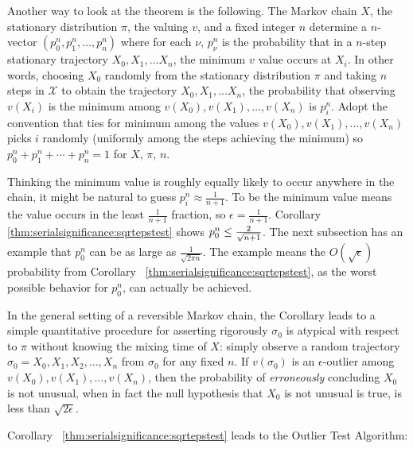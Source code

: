\documentclass[12pt]{article}
\begin{document}
Another way to look at the theorem is the following.  The Markov chain \(
X \), the stationary distribution \( \pi \), the valuing \( v \), and a
fixed integer \( n \) determine a \( n \)-vector \( (p_0^n, p_1^n, \dots,
p_n^n) \) where for each \( \nu \), \( p_{\nu}^n \) is the probability
that in a \( n \)-step stationary trajectory \( X_0, X_1, \dots X_n \),
the minimum \( v \) value occurs at \( X_i \).  In other words, choosing
\( X_0 \) randomly from the stationary distribution \( \pi \) and taking
\( n \) steps in \( \mathcal{X} \) to obtain the trajectory \( X_0, X_1,
\dots X_n \), the probability that observing \( v(X_i) \) is the minimum
among \( v(X_0), v(X_1), \dots, v(X_n) \) is \( p_i^n \).  Adopt the
convention that ties for minimum among the values \( v (X_0), v (X_1),
\dots, v(X_n) \) picks \( i \) randomly (uniformly among the steps
achieving the minimum) so \( p_0^n + p_1^n + \cdots + p_n^n = 1 \) for \(
X \), \( \pi \), \( n \).

Thinking the minimum value is roughly equally likely to occur anywhere
in the chain, it might be natural to guess \( p_i^n \approx \frac{1}{n+1}
\).  To be the minimum value means the value occurs in the least \(
\frac{1}{n+1} \) fraction, so \( \epsilon = \frac {1}{n+1} \).
Corollary~%
\ref{thm:serialsignificance:sqrtepstest} shows \( p_0^n \le \frac{2}{\sqrt
{%
n+1}} \).  The next subsection has an example that \( p_0^n \) can be as
large as \( \frac{1}{\sqrt{2\pi n}} \).  The example means the \( O (\sqrt
{\epsilon}) \) probability from Corollary~%
\ref{thm:serialsignificance:sqrtepstest}, as the worst possible behavior
for \( p_0^n \), can actually be achieved.

In the general setting of a reversible Markov chain, the Corollary leads
to a simple quantitative procedure for asserting rigorously \( \sigma_0 \)
is atypical with respect to \( \pi \) without knowing the mixing time of
\( X \):  simply observe a random trajectory \( \sigma_0 = X_0 , X_1, X_2,
\dots, X_n \) from \( \sigma_0 \) for any fixed \( n \).  If \( v(\sigma_0
) \) is an \( \epsilon \)-outlier among \( v(X_0), v(X_1), \dots, v(X_n)
\), then the probability of \emph{erroneously} concluding \( X_0 \) is
not unusual, when in fact the null hypothesis that \( X_0 \) is not
unusual is true, is less than \( \sqrt{2 \epsilon } \).

Corollary~%
\ref{thm:serialsignificance:sqrtepstest} leads to the Outlier Test
Algorithm:%
\end{document}
